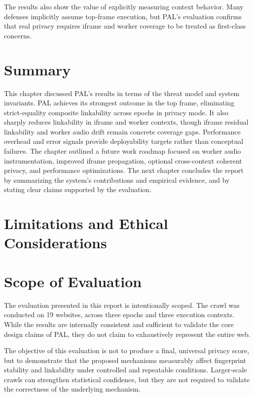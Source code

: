 \documentclass[11pt]{report}
\begin{document}
The results also show the value of explicitly measuring context behavior. Many defenses implicitly assume top-frame execution, but PAL’s evaluation confirms that real privacy requires iframe and worker coverage to be treated as first-class concerns.

\section{Summary}

This chapter discussed PAL’s results in terms of the threat model and system invariants. PAL achieves its strongest outcome in the top frame, eliminating strict-equality composite linkability across epochs in privacy mode. It also sharply reduces linkability in iframe and worker contexts, though iframe residual linkability and worker audio drift remain concrete coverage gaps. Performance overhead and error signals provide deployability targets rather than conceptual failures. The chapter outlined a future work roadmap focused on worker audio instrumentation, improved iframe propagation, optional cross-context coherent privacy, and performance optimizations. The next chapter concludes the report by summarizing the system’s contributions and empirical evidence, and by stating clear claims supported by the evaluation.













\section{Limitations and Ethical Considerations}

\section{Scope of Evaluation}

The evaluation presented in this report is intentionally scoped. The crawl was conducted on 19 websites, across three epochs and three execution contexts. While the results are internally consistent and sufficient to validate the core design claims of PAL, they do not claim to exhaustively represent the entire web.

The objective of this evaluation is not to produce a final, universal privacy score, but to demonstrate that the proposed mechanisms measurably affect fingerprint stability and linkability under controlled and repeatable conditions. Larger-scale crawls can strengthen statistical confidence, but they are not required to validate the correctness of the underlying mechanism.
\end{document}
